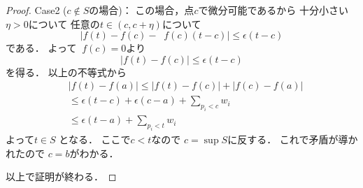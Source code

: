 \documentclass[leqno, a4paper, 12pt]{jsarticle}
\DeclareMathOperator{\dini}{D_{+}}
\begin{document}
\begin{proof}
Case2 ($c\not\in S$の場合)：
この場合，点$c$で微分可能であるから
十分小さい$\eta>0$について
任意の$t\in (c, c+\eta)$について
\[
|f(t)-f(c)-\dini f(c)(t-c)|
\le \epsilon(t-c)
\]
である．
よって$\dini f(c)=0$より
\[
|f(t)-f(c)|
\le
\epsilon(t-c)
\]
を得る．
以上の不等式から
\begin{align*}
&|f(t)-f(a)|
\le 
|f(t)-f(c)|+|f(c)-f(a)|\\
&\le 
\epsilon(t-c)
+\epsilon(c-a)+
\sum_{p_{i}<c}w_{i}
\\
&
\le 
\epsilon(t-a)+
\sum_{p_{i}<t}w_{i}
\end{align*}
よって$t\in S$
となる．
ここで$c<t$なので
$c=\sup S$に反する．
これで矛盾が導かれたので
$c=b$がわかる．

以上で証明が終わる．
\end{proof}
\end{document}
